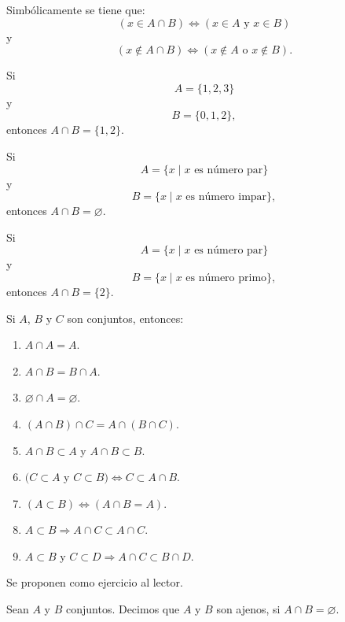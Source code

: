 Simbólicamente se tiene que:
$$(x \in A \cap B) \Longleftrightarrow(x \in A \text { y } x \in B)$$
y
$$(x \notin A \cap B) \Longleftrightarrow(x \notin A \text { o } x \notin B).$$

\begin{examplebox}{}{}
    Si
    $$A = \{1,  2,  3\}$$
    y
    $$B = \{0,  1,  2\},$$
    entonces $A \cap B = \{1,  2\}$.
\end{examplebox}

\begin{examplebox}{}{}
    Si
    $$A = \{x \mid x \text{ es número par}\}$$
    y
    $$B = \{x \mid x \text{ es número impar}\},$$
    entonces $A \cap B = \varnothing$.
\end{examplebox}

\begin{examplebox}{}{}
    Si
    $$A = \{x \mid x \text{ es número par}\}$$
    y
    $$B = \{x \mid x \text{ es número primo}\},$$
    entonces $A \cap B = \{ 2 \}$.
\end{examplebox}

\newpage

\begin{prop}{}{}
    Si $A$, $B$ y $C$ son conjuntos, entonces:
    \begin{enumerate}[label=\roman*., topsep=6pt, itemsep=0pt]
        \item $A \cap A=A$.
        \item $A \cap B=B \cap A$.
        \item $\varnothing \cap A=\varnothing$.
        \item $(A \cap B) \cap C=A \cap(B \cap C)$.
        \item $A \cap B \subset A$ y $A \cap B \subset B$.
        \item $(C \subset A$ y $C \subset B) \Longleftrightarrow C \subset A \cap B$.
        \item $(A \subset B) \Longleftrightarrow(A \cap B=A)$.
        \item $A \subset B \Longrightarrow A \cap C \subset A \cap C$.
        \item $A \subset B$ y $C \subset D \Longrightarrow A \cap C \subset B \cap D$.
    \end{enumerate}
    \tcblower
    \demostracion Se proponen como ejercicio al lector.
\end{prop}

\begin{definicion}{}{}
    Sean $A$ y $B$ conjuntos. Decimos que $A$ y $B$ son ajenos, si $A \cap B = \varnothing$.
\end{definicion}

